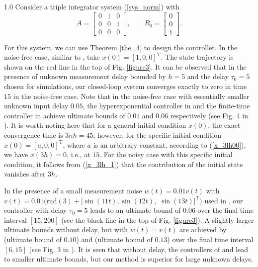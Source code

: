 \documentclass[journal]{IEEEtran}
\begin{document}
\begin{spacing}{1.0}
Consider a triple integrator system (\ref{sys_norm}) with
\[
A=
\begin{bmatrix}
0 & 1 & 0\\
0 & 0 & 1\\
0 & 0 & 0
\end{bmatrix},
\qquad
B_{0}=
\begin{bmatrix}
0\\
0\\
1
\end{bmatrix}.
\]

For this system, we can use Theorem \ref{the_4} to design the controller. In the noise-free case, similar to \cite{Zime25auto}, take
$x(0)=[1,0,0]^{\mathrm{T}}$. The state trajectory is shown on the red line in the top of Fig.
\ref{figure3}. It can be observed that in the presence of unknown measurement
delay bounded by $h=5$ and the delay $\tau_{0}=5$ chosen for simulations, our
closed-loop system converges exactly to zero in time $15$ in the noise-free
case. Note that in the noise-free case with essentially smaller unknown input
delay $0.05$, the hyperexponential controller in \cite{Zime25auto} and the
finite-time controller in \cite{Polyakov11tac} achieve ultimate bounds of $0.01$ and $0.06$ respectively (see Fig. 4 in \cite{Zime25auto}). It is worth noting here that for a general initial condition $x(0)$, the exact convergence time is $3nh = 45$; however, for the specific initial condition $x(0) = [a,0,0]^{\mathrm{T}}$, where $a$ is an arbitrary constant, according to (\ref{x_3lh00}), we have $x(3h) = 0$, i.e., at $15$. For the noisy case with this specific initial condition, it follows from (\ref{x_3lh_1}) that the contribution of the initial state vanishes after $3h$.



In the presence of a small measurement noise $w(t)=0.01v(t)$ with
$v(t)=0.01(\mathrm{rnd}(3)+[\sin(11t),\sin(12t),$ $\sin(13t)]^{\mathrm{T}})$ used
in \cite{Zime25auto}, our controller with delay $\tau
_{0}=5$ leads to an ultimate bound of $0.06$ over the final time interval $[15,200]$ (see the black line in the top of Fig.
\ref{figure3}). A slightly larger ultimate bounds without delay, but with $w(t)=v(t)$ are achieved by
\cite{Zime25auto} (ultimate bound of $0.10$) and \cite{Polyakov11tac}
(ultimate bound of $0.13$) over the final time interval $[6,15]$ (see Fig. 3 in \cite{Zime25auto}). It is seen that without delay, the
controllers of \cite{Zime25auto} and \cite{Polyakov11tac} lead to smaller
ultimate bounds, but our method is superior for large unknown delays.



\end{spacing}
\end{document}
